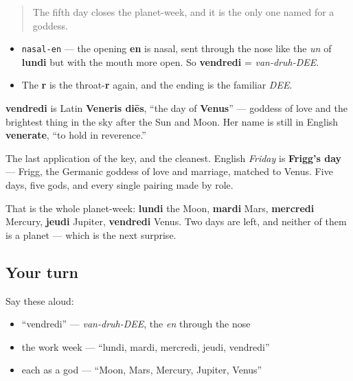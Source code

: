 \begin{quote}
The fifth day closes the planet-week, and it is the only one named for a goddess.
\end{quote}

\begin{sounds}
\begin{itemize}
\raggedright
  \item \texttt{nasal-en} — the opening \textbf{en} is nasal, sent through the nose like the \emph{un} of \textbf{lundi} but with the mouth more open. So \textbf{vendredi} = \emph{van-druh-DEE}.
  \item The \textbf{r} is the throat-\textbf{r} again, and the ending is the familiar \emph{DEE}.
\end{itemize}
\end{sounds}

\begin{cousinweb}
\textbf{vendredi} is Latin \textbf{Veneris diēs}, \textquotedblleft{}the day of \textbf{Venus}\textquotedblright{} — goddess of love and the brightest thing in the sky after the Sun and Moon. Her name is still in English \textbf{venerate}, \textquotedblleft{}to hold in reverence.\textquotedblright{}
\end{cousinweb}

\begin{culture}
The last application of the key, and the cleanest. English \emph{Friday} is \textbf{Frigg's day} — Frigg, the Germanic goddess of love and marriage, matched to Venus. Five days, five gods, and every single pairing made by role.

That is the whole planet-week: \textbf{lundi} the Moon, \textbf{mardi} Mars, \textbf{mercredi} Mercury, \textbf{jeudi} Jupiter, \textbf{vendredi} Venus. Two days are left, and neither of them is a planet — which is the next surprise.
\end{culture}

\subsection*{Your turn}
Say these aloud:

\begin{itemize}
\raggedright
  \item \textquotedblleft{}vendredi\textquotedblright{} — \emph{van-druh-DEE}, the \emph{en} through the nose
  \item the work week — \textquotedblleft{}lundi, mardi, mercredi, jeudi, vendredi\textquotedblright{}
  \item each as a god — \textquotedblleft{}Moon, Mars, Mercury, Jupiter, Venus\textquotedblright{}
\end{itemize}

